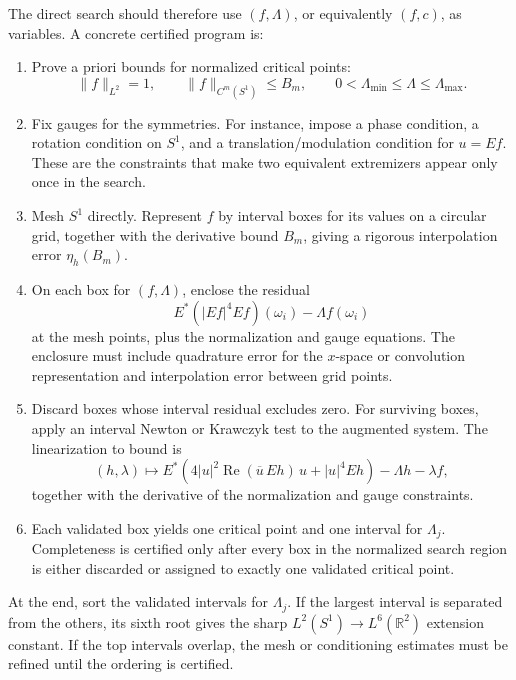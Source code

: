 \documentclass[12pt]{article}
\begin{document}
The direct search should therefore use $(f,\Lambda)$, or equivalently
$(f,c)$, as variables. A concrete certified program is:
\begin{enumerate}[leftmargin=2em]
  \item Prove a priori bounds for normalized critical points:
    \[
      \|f\|_{L^2}=1,\qquad
      \|f\|_{C^m(S^1)}\leq B_m,\qquad
      0<\Lambda_{\min}\leq\Lambda\leq\Lambda_{\max}.
    \]

  \item Fix gauges for the symmetries. For instance, impose a phase condition,
    a rotation condition on $S^1$, and a translation/modulation condition for
    $u=Ef$. These are the constraints that make two equivalent extremizers
    appear only once in the search.

  \item Mesh $S^1$ directly. Represent $f$ by interval boxes for its values on
    a circular grid, together with the derivative bound $B_m$, giving a
    rigorous interpolation error $\eta_h(B_m)$.

  \item On each box for $(f,\Lambda)$, enclose the residual
    \[
      E^*(|Ef|^4Ef)(\omega_i)-\Lambda f(\omega_i)
    \]
    at the mesh points, plus the normalization and gauge equations. The
    enclosure must include quadrature error for the $x$-space or convolution
    representation and interpolation error between grid points.

  \item Discard boxes whose interval residual excludes zero. For surviving
    boxes, apply an interval Newton or Krawczyk test to the augmented system.
    The linearization to bound is
    \[
      (h,\lambda)\mapsto
      E^*\!\left(4|u|^2\operatorname{Re}(\overline u\,Eh)\,u
        + |u|^4Eh\right)
      -\Lambda h-\lambda f,
    \]
    together with the derivative of the normalization and gauge constraints.

  \item Each validated box yields one critical point and one interval for
    $\Lambda_j$. Completeness is certified only after every box in the
    normalized search region is either discarded or assigned to exactly one
    validated critical point.
\end{enumerate}

At the end, sort the validated intervals for $\Lambda_j$. If the largest
interval is separated from the others, its sixth root gives the sharp
$L^2(S^1)\to L^6(\mathbb R^2)$ extension constant. If the top intervals overlap,
the mesh or conditioning estimates must be refined until the ordering is
certified.
\end{document}

